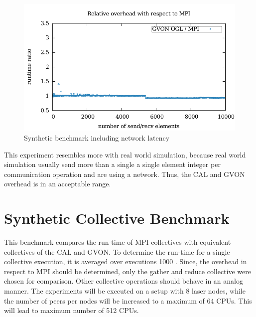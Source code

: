 \begin{figure}[H]
\begin{minipage}[t]{0.5\textwidth}
        \includegraphics[width=\textwidth]{plots/50_nsize_one_lookup_network_overhead_gvon_laser}
  \end{minipage}%
  \caption{Synthetic benchmark including network latency}
  \label{fig:nsend_network}
\end{figure}

\noindent This experiment resembles more with real world simulation,
because real world simulation usually send more than a single a single
element integer per communication operation and are using a
network. Thus, the CAL and GVON overhead is in an acceptable
range.


\section{Synthetic Collective Benchmark}
This benchmark compares the run-time of MPI collectives with
equivalent collectives of the CAL and GVON.  To determine the run-time
for a single collective execution, it is averaged over executions 1000
.  Since, the overhead in respect to MPI should be determined, only
the gather and reduce collective were chosen for comparison. Other
collective operations should behave in an analog manner. The
experiments will be executed on a setup with 8 laser nodes, while the
number of peers per nodes will be increased to a maximum of 64 CPUs.
This will lead to maximum number of 512 CPUs.

